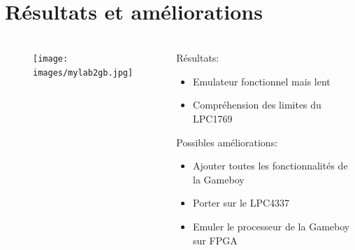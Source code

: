 \documentclass{beamer}
\begin{document}
\section{Résultats et améliorations}
\begin{frame}
	\frametitle{\secname}
  \begin{columns}[T]
		\begin{column}{.40\textwidth}
			\begin{figure}
				\texttt{[image: images/mylab2gb.jpg]}
			\end{figure}
		\end{column}
		\begin{column}{.70\textwidth}
      Résultats:
      \begin{itemize}
        \item Emulateur fonctionnel mais lent
        \item Compréhension des limites du LPC1769
      \end{itemize}
      Possibles améliorations:
      \begin{itemize}
        \item Ajouter toutes les fonctionnalités de la Gameboy
        \item Porter sur le LPC4337
        \item Emuler le processeur de la Gameboy sur FPGA
      \end{itemize}
		\end{column}
	\end{columns}
\end{frame}
\end{document}
